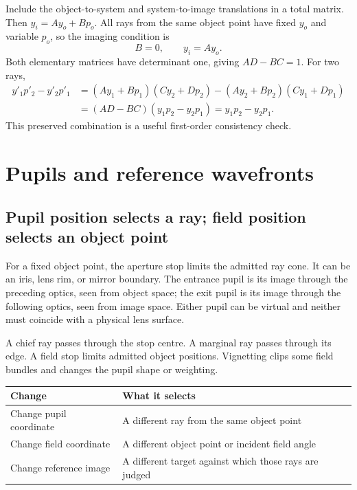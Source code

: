 \documentclass[11pt,a4paper]{article}
\numberwithin{equation}{section}
\begin{document}
Include the object-to-system and system-to-image translations in a total
matrix. Then $y_i=Ay_o+Bp_o$. All rays from the same object point have
fixed $y_o$ and variable $p_o$, so the imaging condition is
\begin{equation}
 \boxed{B=0,\qquad y_i=Ay_o.}
\end{equation}
Both elementary matrices have determinant one, giving $AD-BC=1$.
For two rays,
\begin{align}
 y'_1p'_2-y'_2p'_1
 &=(Ay_1+Bp_1)(Cy_2+Dp_2)
 -(Ay_2+Bp_2)(Cy_1+Dp_1)\\
 &=(AD-BC)(y_1p_2-y_2p_1)=y_1p_2-y_2p_1.
\end{align}
This preserved combination is a useful first-order consistency check.

\section{Pupils and reference wavefronts}
\subsection{Pupil position selects a ray; field position selects an object point}
For a fixed object point, the aperture stop limits the admitted ray cone.
It can be an iris, lens rim, or mirror boundary. The entrance pupil is its
image through the preceding optics, seen from object space; the exit pupil
is its image through the following optics, seen from image space. Either
pupil can be virtual and neither must coincide with a physical lens surface.

A chief ray passes through the stop centre. A marginal ray passes through
its edge. A field stop limits admitted object positions. Vignetting clips
some field bundles and changes the pupil shape or weighting.

\begin{center}
\begin{tabularx}{\textwidth}{@{}lY@{}}
\toprule
Change & What it selects\\ \midrule
Change pupil coordinate & A different ray from the same object point\\
Change field coordinate & A different object point or incident field angle\\
Change reference image & A different target against which those rays are judged\\
\bottomrule
\end{tabularx}
\end{center}
\end{document}
